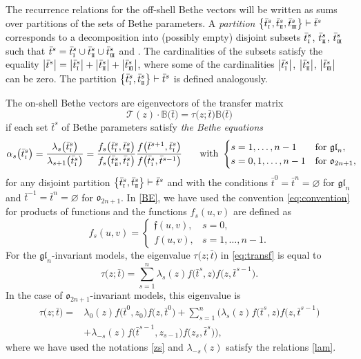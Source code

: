 \documentclass[10pt,a4paper]{amsart}
\newcommand{\so}{\scriptscriptstyle \rm I}
\newcommand{\st}{\scriptscriptstyle \rm I\hspace{-1pt}I}
\newcommand{\sth}{\scriptscriptstyle \rm I\hspace{-1pt}I\hspace{-1pt}I}
\newcommand{\bt}{{\bar t}}
\theoremstyle{definition}
\def\BB{{\mathbb{B}}}
\def\r#1{\eqref{#1}}
\def\fgo{\mathfrak{f}}
\def\eigen{\tau}
\begin{document}
The recurrence relations for the off-shell Bethe vectors will
be written as sums over partitions of the sets of Bethe parameters.
A {\it partition} $ \bigl\{\bt^s_{\so},\bt^s_{\st},\bt^s_{\sth}\bigr\}\vdash \bt^s$
corresponds to a decomposition into (possibly empty) disjoint subsets
$\bt^s_{\so}$, $\bt^s_{\st}$, $\bt^s_{\sth}$ such that
$\bt^s=\bt^s_{\so}\cup\bt^s_{\st}\cup\bt^s_{\sth}$
and \smash{$\bt^s_{\so}\cap\bt^s_{\st}=\bt^s_{\so}\cap\bt^s_{\sth}=\bt^s_{\st}\cap\bt^s_{\sth}=\varnothing$}.
The cardinalities of the subsets satisfy the equality
$
\big|\bt^s\big|=\big|\bt^s_{\so}\big|+\big|\bt^s_{\st}\big|+\big|\bt^s_{\sth}\big|$,
where some of the cardinalities $\big|\bt^s_{\so}\big|$, $\big|\bt^s_{\st}\big|$,
$\big|\bt^s_{\sth}\big|$ can be zero.
The partition $\bigl\{\bt^s_{\so},\bt^s_{\st}\bigr\}\vdash\bt^s$ is
defined analogously.


The on-shell Bethe vectors are eigenvectors of the transfer matrix
\begin{equation}\label{eq:transf}
\mathcal{T}(z)\cdot\BB\bigl(\bt\bigr)=\eigen\bigl(z;\bt\bigr) \BB\bigl(\bt\bigr)
\end{equation}
if each set $\bt^s$ of Bethe parameters satisfy {\it the Bethe equations}
\cite{KR2,Res91}
\begin{gather}
\alpha_s\bigl(\bt^s_{\so}\bigr)=\frac{\lambda_s\bigl(\bt^s_{\so}\bigr)}{\lambda_{s+1}\bigl(\bt^s_{\so}\bigr)}=
\frac{f_s\bigl(\bt^s_{\so},\bt^s_{\st}\bigr)}{f_s\bigl(\bt^s_{\st},\bt^s_{\so}\bigr)}
\frac{f\bigl(\bt^{s+1},\bt^s_{\so}\bigr)}{f\bigl(\bt^s_{\so},\bt^{s-1}\bigr)}
\qquad\!
\text{with } \begin{cases}s=1,\dots,n-1 &\text{for } \mathfrak{gl}_{n},\\
s=0,1,\dots,n-1 &\text{for } \mathfrak{o}_{2n+1},\end{cases}\!\!\!\label{BE}
\end{gather}
for any disjoint partition $\bigl\{\bt^s_{\so},\bt^s_{\st}\bigr\}\vdash\bt^s$ and with the conditions $\bt^{0} = \bt^n = \varnothing$ for $\mathfrak{gl}_{n}$ and $\bt^{-1} = \bt^n = \varnothing$ for $\mathfrak{o}_{2n+1}$.
In \r{BE}, we have used the convention \eqref{eq:convention}
for products of functions
and
the functions $f_s(u,v)$ are defined as
\[
f_s(u,v)=\begin{cases}\fgo(u,v),  &s=0,\\f(u,v),  &s=1,\dots,n-1 .
\end{cases}
\]
For the
$\mathfrak{gl}_{n}$-invariant models, the eigenvalue $\eigen\bigl(z;\bt\bigr)$ in \eqref{eq:transf}
is equal to \cite{KR2}
\[
\eigen\bigl(z;\bt\bigr)=\sum_{s=1}^n \lambda_s(z) f\bigl(\bt^s,z\bigr) f\bigl(z,\bt^{s-1}\bigr) .
\]
In the case of $\mathfrak{o}_{2n+1}$-invariant models, this eigenvalue is
\cite{LP2,Res91}
\begin{align*}
\eigen\bigl(z;\bt\bigr)={}&\lambda_0(z) f\bigl(\bt^0,z_0\bigr) f\bigl(z,\bt^0\bigr)+
\sum_{s=1}^n \bigl(\lambda_s(z) f\bigl(\bt^s,z\bigr) f\bigl(z,\bt^{s-1}\bigr)\\
&
+\lambda_{-s}(z) f\bigl(\bt^{s-1},z_{s-1}\bigr) f\bigl(z_s,\bt^{s}\bigr)\bigr) ,
\end{align*}
where we have used the notations \r{zs} and
 $\lambda_{-s}(z)$ satisfy the relations \r{lam}.
\end{document}
